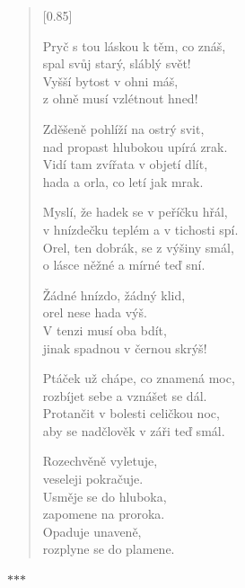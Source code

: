 \documentclass[12pt, a4paper]{article}
\newcommand{\ornament}{
    \vspace{1.5em}
    \begin{center}
        $\ast$\quad$\ast$\quad$\ast$
    \end{center}
    \vspace{1.5em}
}
\begin{document}
\begin{verse}[0.85\textwidth]
\vspace{1em}

Pryč s tou láskou k těm, co znáš, \\
spal svůj starý, sláblý svět! \\
Vyšší bytost v ohni máš, \\
z ohně musí vzlétnout hned!

\vspace{1em}

Zděšeně pohlíží na ostrý svit, \\
nad propast hlubokou upírá zrak. \\
Vidí tam zvířata v objetí dlít, \\
hada a orla, co letí jak mrak.

\vspace{1em}

Myslí, že hadek se v peříčku hřál, \\
v hnízdečku teplém a v tichosti spí. \\
Orel, ten dobrák, se z výšiny smál, \\
o lásce něžné a mírné teď sní.

\vspace{1em}

Žádné hnízdo, žádný klid, \\
orel nese hada výš. \\
V tenzi musí oba bdít, \\
jinak spadnou v černou skrýš!

\vspace{1em}

Ptáček už chápe, co znamená moc, \\
rozbíjet sebe a vznášet se dál. \\
Protančit v bolesti celičkou noc, \\
aby se nadčlověk v záři teď smál.

\vspace{1em}
\newpage

Rozechvěně vyletuje, \\
veseleji pokračuje. \\
Usměje se do hluboka, \\
zapomene na proroka. \\
Opaduje unaveně, \\
rozplyne se do plamene.

\end{verse}


\ornament

\end{document}
